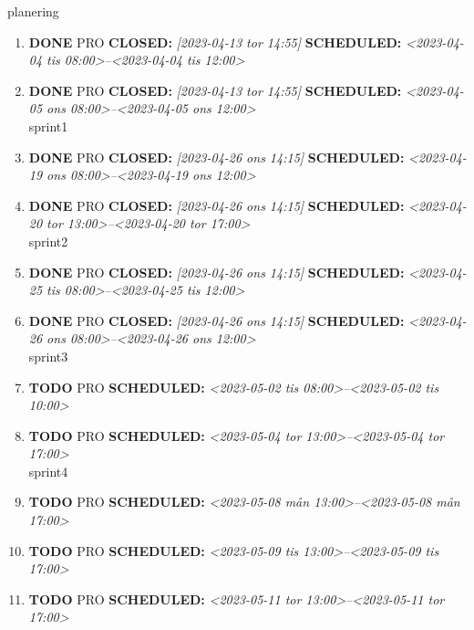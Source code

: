 \documentclass[11pt]{article}
\begin{document}
planering
\begin{enumerate}
\item {\bfseries\sffamily DONE} PRO
\label{sec:org625d74d}
\noindent\textbf{CLOSED:} \textit{[2023-04-13 tor 14:55] } \textbf{SCHEDULED:} \textit{<2023-04-04 tis 08:00>--<2023-04-04 tis 12:00>}\\[0pt]
\item {\bfseries\sffamily DONE} PRO
\label{sec:orgecbc356}
\noindent\textbf{CLOSED:} \textit{[2023-04-13 tor 14:55] } \textbf{SCHEDULED:} \textit{<2023-04-05 ons 08:00>--<2023-04-05 ons 12:00>}\\[0pt]

sprint1
\item {\bfseries\sffamily DONE} PRO
\label{sec:orga3dde21}
\noindent\textbf{CLOSED:} \textit{[2023-04-26 ons 14:15] } \textbf{SCHEDULED:} \textit{<2023-04-19 ons 08:00>--<2023-04-19 ons 12:00>}\\[0pt]
\item {\bfseries\sffamily DONE} PRO
\label{sec:org9df96f1}
\noindent\textbf{CLOSED:} \textit{[2023-04-26 ons 14:15] } \textbf{SCHEDULED:} \textit{<2023-04-20 tor 13:00>--<2023-04-20 tor 17:00>}\\[0pt]

sprint2
\item {\bfseries\sffamily DONE} PRO
\label{sec:orgc7053fb}
\noindent\textbf{CLOSED:} \textit{[2023-04-26 ons 14:15] } \textbf{SCHEDULED:} \textit{<2023-04-25 tis 08:00>--<2023-04-25 tis 12:00>}\\[0pt]
\item {\bfseries\sffamily DONE} PRO
\label{sec:org62a4efe}
\noindent\textbf{CLOSED:} \textit{[2023-04-26 ons 14:15] } \textbf{SCHEDULED:} \textit{<2023-04-26 ons 08:00>--<2023-04-26 ons 12:00>}\\[0pt]

sprint3
\item {\bfseries\sffamily TODO} PRO
\label{sec:orgbd17e11}
\noindent\textbf{SCHEDULED:} \textit{<2023-05-02 tis 08:00>--<2023-05-02 tis 10:00>}\\[0pt]
\item {\bfseries\sffamily TODO} PRO
\label{sec:org3e6ec36}
\noindent\textbf{SCHEDULED:} \textit{<2023-05-04 tor 13:00>--<2023-05-04 tor 17:00>}\\[0pt]

sprint4
\item {\bfseries\sffamily TODO} PRO
\label{sec:orgc0fd5c4}
\noindent\textbf{SCHEDULED:} \textit{<2023-05-08 mån 13:00>--<2023-05-08 mån 17:00>}\\[0pt]
\item {\bfseries\sffamily TODO} PRO
\label{sec:org2eb7240}
\noindent\textbf{SCHEDULED:} \textit{<2023-05-09 tis 13:00>--<2023-05-09 tis 17:00>}\\[0pt]
\item {\bfseries\sffamily TODO} PRO
\label{sec:orgfaea7e8}
\noindent\textbf{SCHEDULED:} \textit{<2023-05-11 tor 13:00>--<2023-05-11 tor 17:00>}\\[0pt]
\end{enumerate}
\end{document}
